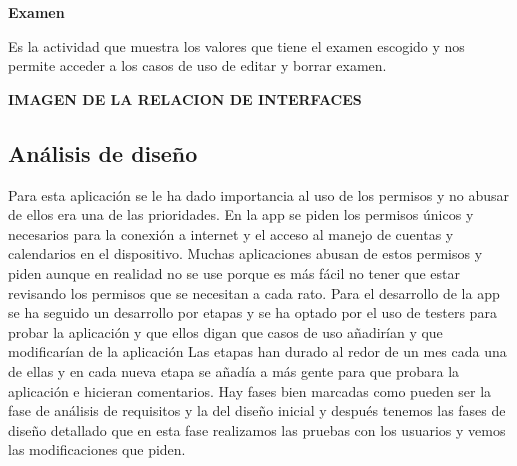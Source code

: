 \textbf{Examen}

Es la actividad que muestra los valores que tiene el examen escogido y nos permite acceder a los casos de uso de editar y borrar examen.

\textbf{IMAGEN DE LA RELACION DE INTERFACES}

\subsection{Análisis de diseño}
\label{subsecc:Análisis de diseño}

Para esta aplicación se le ha dado importancia al uso de los permisos y no abusar de ellos era una de las prioridades.
En la app se piden los permisos únicos y necesarios para la conexión a internet y el acceso al manejo de cuentas y calendarios en el dispositivo.
Muchas aplicaciones abusan de estos permisos y piden aunque en realidad no se use porque es más fácil no tener que estar revisando los permisos que se necesitan a cada rato.
Para el desarrollo de la app se ha seguido un desarrollo por etapas y se ha optado por el uso de testers para probar la aplicación y que ellos digan que casos de uso añadirían y que modificarían de la aplicación
Las etapas han durado al redor de un mes cada una de ellas y en cada nueva etapa se añadía a más gente para que probara la aplicación e hicieran comentarios.
Hay fases bien marcadas como pueden ser la fase de análisis de requisitos y la del diseño inicial y después tenemos las fases de diseño detallado que en esta fase realizamos las pruebas con los usuarios y vemos las modificaciones que piden.






















